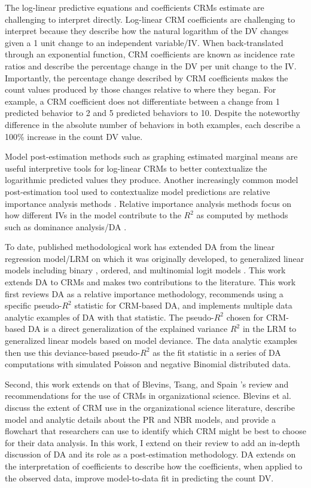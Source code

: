 \documentclass[doc]{apa7}
\begin{document}
	The log-linear predictive equations and coefficients CRMs estimate are challenging to interpret directly.
	Log-linear CRM coefficients are challenging to interpret because they describe how the natural logarithm of the DV changes given a 1 unit change to an independent variable/IV. 
	When back-translated through an exponential function, CRM coefficients are known as incidence rate ratios and describe the percentage change in the DV per unit change to the IV.
	Importantly, the percentage change described by CRM coefficients makes the count values produced by those changes relative to where they began.
	For example, a CRM coefficient does not differentiate between a change from 1 predicted behavior to 2 and 5 predicted behaviors to 10. 
	Despite the noteworthy difference in the absolute number of behaviors in both examples, each describe a 100\% increase in the count DV value.
		
	Model post-estimation methods such as graphing estimated marginal means are useful interpretive tools for log-linear CRMs to better contextualize the logarithmic predicted values they produce.
	Another increasingly common model post-estimation tool used to contextualize model predictions are relative importance analysis methods \parencite{tonidandel2011relative}. 
	Relative importance analysis methods focus on how different IVs in the model contribute to the $R^2$ as computed by methods such as dominance analysis/DA \parencite{azen2003dominance}.
	
	To date, published methodological work has extended DA from the linear regression model/LRM on which it was originally developed, to generalized linear models including binary \parencite{azen2009using}, ordered, and multinomial logit models \parencite{luchman2014relative}.	
	This work extends DA to CRMs and makes two contributions to the literature.
	This work first reviews DA as a relative importance methodology, recommends using a specific pseudo-$R^2$ statistic for CRM-based DA, and implements multiple data analytic examples of DA with that statistic.
	The pseudo-$R^2$ chosen for CRM-based DA is a direct generalization of the explained variance $R^2$ in the LRM to generalized linear models based on model deviance.
	The data analytic examples then use this deviance-based pseudo-$R^2$ as the fit statistic in a series of DA computations with simulated Poisson and negative Binomial distributed data.

	Second, this work extends on that of Blevins, Tsang, and Spain \parencite*{blevins2015count}'s review and recommendations for the use of CRMs in organizational science. 
	Blevins et al. discuss the extent of CRM use in the organizational science literature, describe model and analytic details about the PR and NBR models, and provide a flowchart that researchers can use to identify which CRM might be best to choose for their data analysis.
	In this work, I extend on their review to add an in-depth discussion of DA and its role as a post-estimation methodology.
	DA extends on the interpretation of coefficients to describe how the coefficients, when applied to the observed data, improve model-to-data fit in predicting the count DV.
\end{document}
